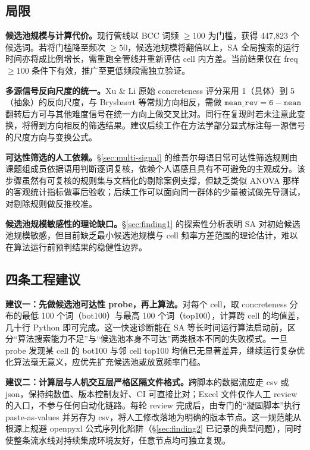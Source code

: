 \documentclass[12pt, a4paper]{article}
\begin{document}
\subsection{局限}

\textbf{候选池规模与计算代价。}现行管线以 BCC 词频 $\geq 100$ 为门槛，获得 447{,}823 个候选词。若将门槛降至频次 $\geq 50$，候选池规模将翻倍以上，SA 全局搜索的运行时间亦将成比例增长，需重跑全管线并重新评估 cell 内方差。当前结果仅在 freq $\geq 100$ 条件下有效，推广至更低频段需独立验证。

\textbf{多源信号反向尺度的统一。}Xu \& Li 原始 concreteness 评分采用 1（具体）到 5（抽象）的反向尺度，与 Brysbaert 等常规方向相反，需做 $\mathtt{mean\_rev = 6 - mean}$ 翻转后方可与其他难度信号在统一方向上做交叉比对。同行在复现时若未注意此变换，将得到方向相反的筛选结果。建议后续工作在方法学部分显式标注每一源信号的尺度方向与变换公式。

\textbf{可达性筛选的人工依赖。}\S\ref{sec:multi-signal} 的维吾尔母语日常可达性筛选规则由课题组成员依据语用判断逐词复核，依赖个人语感且具有不可避免的主观成分。该步骤虽然有可复核的规则集与文档化的剔除案例支撑，但缺乏类似 ANOVA 那样的客观统计指标做事后验收；后续工作可以面向同一群体的少量被试做先导测试，对剔除规则做反推校准。

\textbf{候选池规模敏感性的理论缺口。}\S\ref{sec:finding1} 的探索性分析表明 SA 对初始候选池规模敏感，但目前缺乏最小候选池规模与 cell 频率方差范围的理论估计，难以在算法运行前预判结果的稳健性边界。

\subsection{四条工程建议}

\textbf{建议一：先做候选池可达性 probe，再上算法。}对每个 cell，取 concreteness 分布的最低 100 个词（bot100）与最高 100 个词（top100），计算跨 cell 的均值差，几十行 Python 即可完成。这一快速诊断能在 SA 等长时间运行算法启动前，区分“算法搜索能力不足”与“候选池本身不可达”两类根本不同的失败模式。一旦 probe 发现某 cell 的 bot100 与邻 cell top100 均值已无显著差异，继续运行复杂优化算法毫无意义，应优先扩充候选池或放宽频率门槛。

\textbf{建议二：计算层与人机交互层严格区隔文件格式。}跨脚本的数据流应走 csv 或 json，保持纯数值、版本控制友好、CI 可直接比对；Excel 文件仅作人工 review 的入口，不参与任何自动化链路。每轮 review 完成后，由专门的“凝固脚本”执行 paste-as-values 并另存为 csv，将人工修改落地为明确的版本节点。这一规范能从根源上规避 openpyxl 公式序列化陷阱（\S\ref{sec:finding2} 已记录的典型问题），同时使整条流水线对持续集成环境友好，任意节点均可独立复现。
\end{document}
